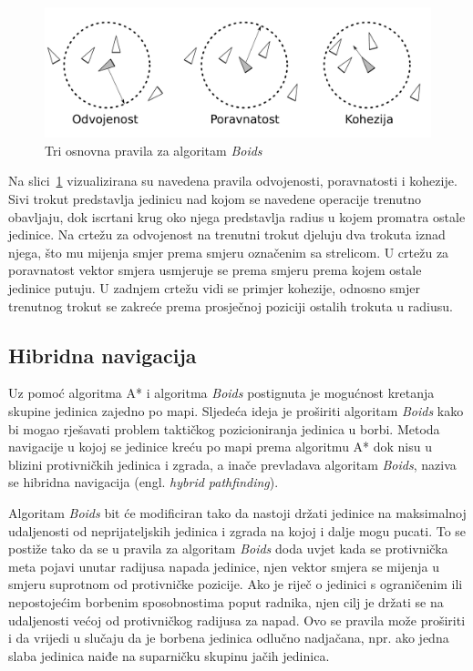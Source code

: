 \documentclass[times, utf8, zavrsni, numeric]{fer}
\begin{document}
\begin{figure}[h]
	\centering
	\includegraphics[width=1.0\linewidth]{images/boids.pdf}
	\caption{Tri osnovna pravila za algoritam \textit{Boids}}
	\label{fig:boids}
\end{figure}

\par Na slici~\ref{fig:boids} vizualizirana su navedena pravila odvojenosti, poravnatosti i kohezije. 
Sivi trokut predstavlja jedinicu nad kojom se navedene operacije trenutno obavljaju, dok iscrtani krug oko njega predstavlja radius u kojem promatra ostale jedinice. 
Na crtežu za odvojenost na trenutni trokut djeluju dva trokuta iznad njega, što mu mijenja smjer prema smjeru označenim sa strelicom. 
U crtežu za poravnatost vektor smjera usmjeruje se prema smjeru prema kojem ostale jedinice putuju. 
U zadnjem crtežu vidi se primjer kohezije, odnosno smjer trenutnog trokut se zakreće prema prosječnoj poziciji ostalih trokuta u radiusu.

\subsection{Hibridna navigacija}

\par Uz pomoć algoritma A* i algoritma \textit{Boids} postignuta je mogućnost kretanja skupine jedinica zajedno po mapi.
Sljedeća ideja je proširiti algoritam \textit{Boids} kako bi mogao rješavati problem taktičkog pozicioniranja jedinica u borbi.
Metoda navigacije u kojoj se jedinice kreću po mapi prema algoritmu A* dok nisu u blizini protivničkih jedinica i zgrada, a inače prevladava algoritam \textit{Boids}, naziva se hibridna navigacija (engl. \textit{hybrid pathfinding})\cite{article:HybridPathdinding}.

\par Algoritam \textit{Boids} bit će modificiran tako da nastoji držati jedinice na maksimalnoj udaljenosti od neprijateljskih jedinica i zgrada na kojoj i dalje mogu pucati.
To se postiže tako da se u pravila za algoritam \textit{Boids} doda uvjet kada se protivnička meta pojavi unutar radijusa napada jedinice, njen vektor smjera se mijenja u smjeru suprotnom od protivničke pozicije.
Ako je riječ o jedinici s ograničenim ili nepostojećim borbenim sposobnostima poput radnika, njen cilj je držati se na udaljenosti većoj od protivničkog radijusa za napad.
Ovo se pravila može proširiti i da vrijedi u slučaju da je borbena jedinica odlučno nadjačana, npr. ako jedna slaba jedinica naiđe na suparničku skupinu jačih jedinica.
\end{document}
